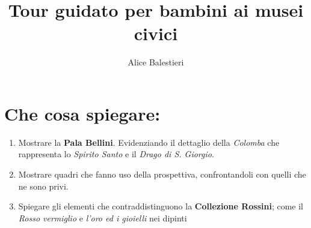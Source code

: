 \documentclass[12pt,a4paper]{article}
\begin{document}
\title{\textbf{Tour guidato per bambini ai musei civici}}
\author{Alice Balestieri}
\date{}

\maketitle
\newpage

\section{Che cosa spiegare:}

	\begin{enumerate}
	\item Mostrare la \textbf{Pala Bellini}. Evidenziando il dettaglio della \textit{Colomba} che rappresenta lo \textit{Spirito Santo} e il \textit{Drago di S. Giorgio}.
	\item Mostrare quadri che fanno uso della prospettiva, confrontandoli con quelli che ne sono privi.
	\item Spiegare gli elementi che contraddistinguono la \textbf{Collezione Rossini}; come il \textit{Rosso vermiglio} e \textit{l'oro ed i gioielli} nei dipinti
	
	\end{enumerate}
\end{document}
